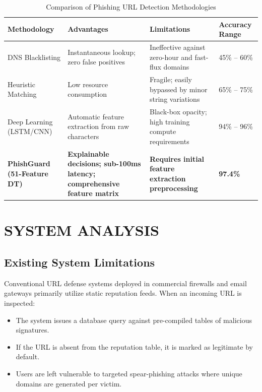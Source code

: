 \documentclass[BTech]{srmuthesis}
\begin{document}
\begin{table}[htpb]
\centering
\caption{Comparison of Phishing URL Detection Methodologies}
\label{tab:lit_comparison}
\begin{tabularx}{\textwidth}{|l|X|X|X|}
\hline
\textbf{Methodology} & \textbf{Advantages} & \textbf{Limitations} & \textbf{Accuracy Range} \\
\hline
DNS Blacklisting & Instantaneous lookup; zero false positives & Ineffective against zero-hour and fast-flux domains & 45\% -- 60\% \\
\hline
Heuristic Matching & Low resource consumption & Fragile; easily bypassed by minor string variations & 65\% -- 75\% \\
\hline
Deep Learning (LSTM/CNN) & Automatic feature extraction from raw characters & Black-box opacity; high training compute requirements & 94\% -- 96\% \\
\hline
\textbf{PhishGuard (51-Feature DT)} & \textbf{Explainable decisions; sub-100ms latency; comprehensive feature matrix} & \textbf{Requires initial feature extraction preprocessing} & \textbf{97.4\%} \\
\hline
\end{tabularx}
\end{table}

\chapter{SYSTEM ANALYSIS}
\label{chap:analysis}

\section{Existing System Limitations}
Conventional URL defense systems deployed in commercial firewalls and email gateways primarily utilize static reputation feeds. When an incoming URL is inspected:
\begin{itemize}
    \item The system issues a database query against pre-compiled tables of malicious signatures.
    \item If the URL is absent from the reputation table, it is marked as legitimate by default.
    \item Users are left vulnerable to targeted spear-phishing attacks where unique domains are generated per victim.
\end{itemize}
\end{document}
